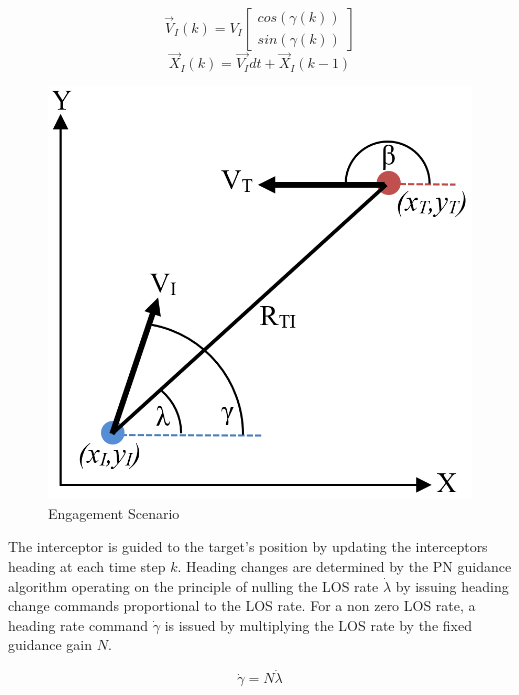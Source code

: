 \documentclass[]{aiaa-tc}%
\begin{document}
\begin{equation}\label{eq:intkin}
\overrightarrow{V}_{I}(k) =  V_{I} \begin{bmatrix} cos(\gamma(k)) \\ sin(\gamma(k)) \end{bmatrix}
\end{equation}
\begin{equation}\label{eq:intkintwo}
\overrightarrow{X}_I(k) =  \overrightarrow{V_I}dt + \overrightarrow{X}_I(k-1) 
\end{equation}





\begin{figure}[H]
	\centering
	\includegraphics[width=6 cm]{Engagement_Model.PNG}
	\caption{Engagement Scenario}
	\label{fig:Egagement}
\end{figure}

The interceptor is guided to the target's position by updating the interceptors heading at each time step $k$. Heading changes are determined by the PN guidance algorithm operating on the principle of nulling the LOS rate $\dot{\lambda}$ by issuing heading change commands proportional to the LOS rate. For a non zero LOS rate, a heading rate command $\dot{\gamma}$ is issued by multiplying the LOS rate by the fixed guidance gain $N$.

\begin{equation} \label{eq:PNlaw}
\dot{\gamma} = N\dot{\lambda}
\end{equation}
\end{document}
